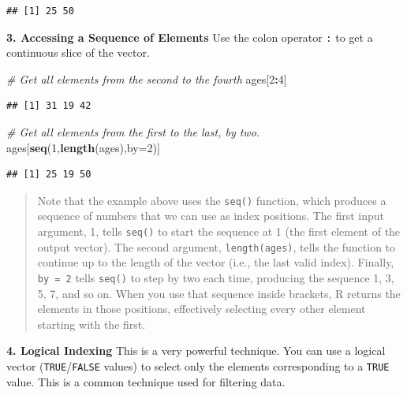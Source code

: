 \documentclass[
  11pt,
]{article}
\newenvironment{Shaded}{\begin{snugshade}}{\end{snugshade}}
\newcommand{\AttributeTok}[1]{\textcolor[rgb]{0.13,0.29,0.53}{#1}}
\newcommand{\CommentTok}[1]{\textcolor[rgb]{0.56,0.35,0.01}{\textit{#1}}}
\newcommand{\DecValTok}[1]{\textcolor[rgb]{0.00,0.00,0.81}{#1}}
\newcommand{\FunctionTok}[1]{\textcolor[rgb]{0.13,0.29,0.53}{\textbf{#1}}}
\newcommand{\NormalTok}[1]{#1}
\newcommand{\SpecialCharTok}[1]{\textcolor[rgb]{0.81,0.36,0.00}{\textbf{#1}}}
\begin{document}
\begin{verbatim}
## [1] 25 50
\end{verbatim}

\textbf{3. Accessing a Sequence of Elements} Use the colon operator
\texttt{:} to get a continuous slice of the vector.

\begin{Shaded}
\begin{Highlighting}[]
\CommentTok{\# Get all elements from the second to the fourth}
\NormalTok{ages[}\DecValTok{2}\SpecialCharTok{:}\DecValTok{4}\NormalTok{]}
\end{Highlighting}
\end{Shaded}

\begin{verbatim}
## [1] 31 19 42
\end{verbatim}

\begin{Shaded}
\begin{Highlighting}[]
\CommentTok{\# Get all elements from the first to the last, by two.}
\NormalTok{ages[}\FunctionTok{seq}\NormalTok{(}\DecValTok{1}\NormalTok{,}\FunctionTok{length}\NormalTok{(ages),}\AttributeTok{by=}\DecValTok{2}\NormalTok{)]}
\end{Highlighting}
\end{Shaded}

\begin{verbatim}
## [1] 25 19 50
\end{verbatim}

\begin{quote}
Note that the example above uses the \texttt{seq()} function, which
produces a sequence of numbers that we can use as index positions. The
first input argument, 1, tells \texttt{seq()} to start the sequence at 1
(the first element of the output vector). The second argument,
\texttt{length(ages)}, tells the function to continue up to the length
of the vector (i.e., the last valid index). Finally, \texttt{by\ =\ 2}
tells \texttt{seq()} to step by two each time, producing the sequence 1,
3, 5, 7, and so on. When you use that sequence inside brackets, R
returns the elements in those positions, effectively selecting every
other element starting with the first.
\end{quote}

\textbf{4. Logical Indexing} This is a very powerful technique. You can
use a logical vector (\texttt{TRUE}/\texttt{FALSE} values) to select
only the elements corresponding to a \texttt{TRUE} value. This is a
common technique used for filtering data.
\end{document}
